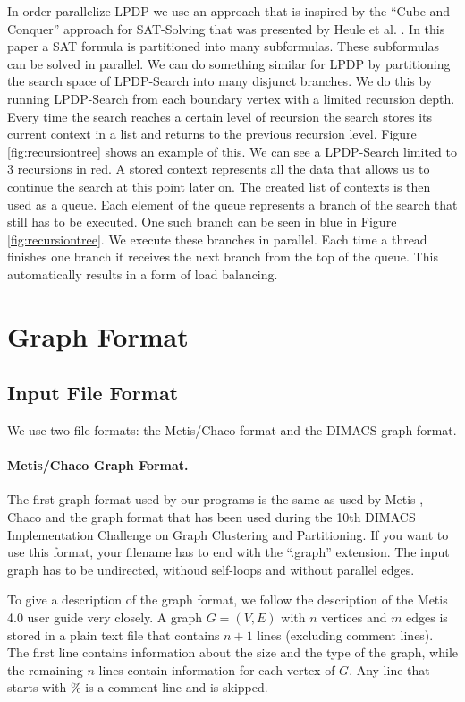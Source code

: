 \documentclass[11pt]{article}
\begin{document}
In order parallelize LPDP we use an approach that is inspired by the ``Cube and Conquer'' approach for SAT-Solving that was presented by Heule et al. \cite{heule}. In this paper a SAT formula is partitioned into many subformulas. These subformulas can be solved in parallel. We can do something similar for LPDP by partitioning the search space of LPDP-Search into many disjunct branches. We do this by running LPDP-Search from each boundary vertex with a limited recursion depth. Every time the search reaches a certain level of recursion the search stores its current context in a list and returns to the previous recursion level. Figure \ref{fig:recursiontree} shows an example of this. We can see a LPDP-Search limited to 3 recursions in red. A stored context represents all the data that allows us to continue the search at this point later on. The created list of contexts is then used as a queue. Each element of the queue represents a branch of the search that still has to be executed. One such branch can be seen in blue in Figure \ref{fig:recursiontree}. We execute these branches in parallel. Each time a thread finishes one branch it receives the next branch from the top of the queue. This automatically results in a form of load balancing.

\FloatBarrier
\pagebreak
\section{Graph Format}
\label{ss:graphformat}
\subsection{Input File Format}
We use two file formats: the Metis/Chaco format and the DIMACS graph format. 

\paragraph*{Metis/Chaco Graph Format.}The first graph format used by our programs is the same as used by Metis \cite{karypis1998fast}, Chaco \cite{chaco} and the graph format that has been used during the 10th DIMACS Implementation Challenge on Graph Clustering and Partitioning. If you want to use this format, your filename has to end with the ``.graph'' extension.
The input graph has to be undirected, withoud self-loops and without parallel edges.

To give a description of the graph format, we follow the description of the Metis 4.0 user guide very closely. A graph $G=(V,E)$ with $n$ vertices and $m$ edges is stored in a plain text file that contains $n+1$ lines (excluding comment lines). The first line contains information about the size and the type of the graph, while the remaining $n$ lines contain information for each vertex of $G$. Any line that starts with \% is a comment line and is skipped.
\end{document}
